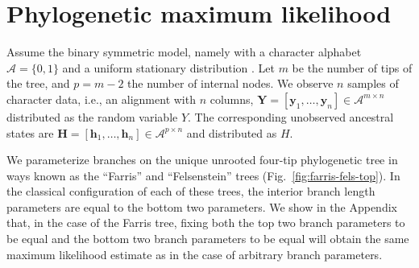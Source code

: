 \documentclass{article}
\newcommand{\alphabet}{\mathcal{A}}
\newcommand{\fullAlignment}{\mathbf{Y}}
\newcommand{\alignmentColumn}{\mathbf{y}}
\newcommand{\alignmentColumnRV}{Y}
\newcommand{\fullAncestralStates}{\mathbf{H}}
\newcommand{\ancestralStateColumn}{\mathbf{h}}
\newcommand{\ancestralStateColumnRV}{H}
\newcommand{\nCols}{n}
\newcommand{\nSiteRows}{m}
\newcommand{\nAncestralStateRows}{p}
\begin{document}
\section*{Phylogenetic maximum likelihood}

Assume the binary symmetric model, namely with a character alphabet $\alphabet=\{0,1\}$ and a uniform stationary distribution \cite{Semple2003-em}.
Let $\nSiteRows$ be the number of tips of the tree, and $\nAncestralStateRows = \nSiteRows-2$ the number of internal nodes.
We observe $\nCols$ samples of character data, i.e., an alignment with $\nCols$ columns, $\fullAlignment=[\alignmentColumn_1,\ldots,\alignmentColumn_\nCols]\in\alphabet^{\nSiteRows\times\nCols}$ distributed as the random variable $\alignmentColumnRV$.
The corresponding unobserved ancestral states are $\fullAncestralStates=[\ancestralStateColumn_1,\ldots,\ancestralStateColumn_\nCols]\in\alphabet^{\nAncestralStateRows\times\nCols}$ and distributed as $\ancestralStateColumnRV$.

We parameterize branches on the unique unrooted four-tip phylogenetic tree in ways known as the ``Farris'' and ``Felsenstein'' trees (Fig.~\ref{fig:farris-fels-top}).
In the classical configuration of each of these trees, the interior branch length parameters are equal to the bottom two parameters.
We show in the Appendix that, in the case of the Farris tree, fixing both the top two branch parameters to be equal and the bottom two branch parameters to be equal will obtain the same maximum likelihood estimate as in the case of arbitrary branch parameters.
\end{document}

